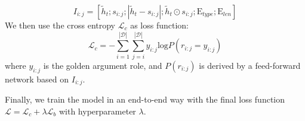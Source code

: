 \begin{equation*}
 I_{i:j} = \left [ \widetilde{h}_t; s_{i:j};  \left | \widetilde{h}_t-s_{i:j} \right |; \widetilde{h}_t \odot s_{i:j};
\mathrm{E}_{type}; \mathrm{E}_{len} \right ] 
\end{equation*}
We then use the cross entropy $\mathcal{L}_{c}$ as loss function:
\begin{equation}
\mathcal{L}_{c} = - \sum_{i=1}^{\left | \mathcal{D} \right | } \sum_{j=i}^{\left | \mathcal{D} \right | }
y_{i:j} \mathrm{log} P \left (r_{i:j} = y_{i:j} \right )
\end{equation}
where $y_{i:j}$ is the golden argument role, and $P\left (r_{i:j} \right)$ is derived by a feed-forward network based on $I_{i:j}$.

Finally, we train the model in an end-to-end way with the final loss function $\mathcal{L} = \mathcal{L}_{c} + \lambda\mathcal{L}_{b}$ with hyperparameter $\lambda$.
